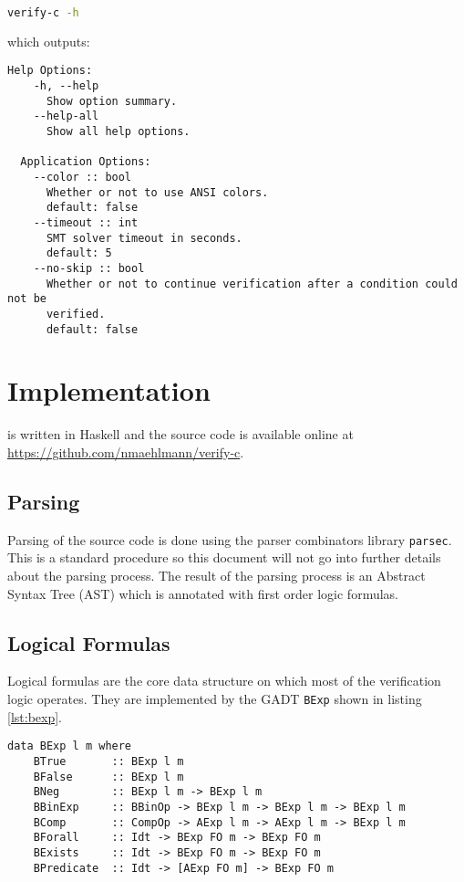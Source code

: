 \documentclass[12pt]{article}
\begin{document}
\begin{lstlisting}[language=bash]
    verify-c -h
\end{lstlisting}

which outputs:
\vspace{0.5cm}

\begin{minipage}{\linewidth}
\begin{lstlisting}[style=cmd]
    Help Options:
    -h, --help
      Show option summary.
    --help-all
      Show all help options.
  
  Application Options:
    --color :: bool
      Whether or not to use ANSI colors.
      default: false
    --timeout :: int
      SMT solver timeout in seconds.
      default: 5
    --no-skip :: bool
      Whether or not to continue verification after a condition could not be
      verified.
      default: false
\end{lstlisting}
\end{minipage}


\section{Implementation}

\verifyc is written in Haskell and the source code is available online at \url{https://github.com/nmaehlmann/verify-c}.

\subsection{Parsing}

Parsing of the source code is done using the parser combinators library \texttt{parsec}.
This is a standard procedure so this document will not go into further details about the parsing process.
The result of the parsing process is an Abstract Syntax Tree (AST) which is annotated with first order logic formulas. 

\subsection{Logical Formulas}

Logical formulas are the core data structure on which most of the verification logic operates.
They are implemented by the GADT \texttt{BExp} shown in listing \ref{lst:bexp}.

\begin{minipage}{\linewidth}
\begin{lstlisting}[style=c0, caption=BExp, label=lst:bexp]
data BExp l m where
    BTrue       :: BExp l m
    BFalse      :: BExp l m
    BNeg        :: BExp l m -> BExp l m
    BBinExp     :: BBinOp -> BExp l m -> BExp l m -> BExp l m
    BComp       :: CompOp -> AExp l m -> AExp l m -> BExp l m
    BForall     :: Idt -> BExp FO m -> BExp FO m
    BExists     :: Idt -> BExp FO m -> BExp FO m
    BPredicate  :: Idt -> [AExp FO m] -> BExp FO m
\end{lstlisting}
\end{minipage}
\end{document}
